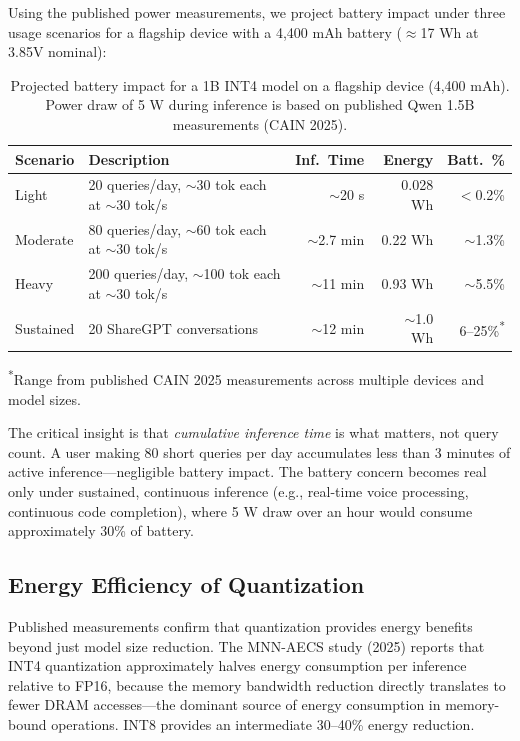 \documentclass[12pt, letterpaper, twoside]{report}
\begin{document}
Using the published power measurements, we project battery impact under three usage scenarios for a flagship device with a 4,400 mAh battery ($\approx$17 Wh at 3.85V nominal):

\begin{table}[H]
\centering
\caption{Projected battery impact for a 1B INT4 model on a flagship device (4,400 mAh). Power draw of 5 W during inference is based on published Qwen 1.5B measurements (CAIN 2025).}
\label{tab:battery_projection}
{\small
\begin{tabular}{@{}lp{4.6cm}rrr@{}}
\toprule
\textbf{Scenario} & \textbf{Description} & \textbf{Inf.\ Time} & \textbf{Energy} & \textbf{Batt.\ \%} \\
\midrule
Light & 20 queries/day, ${\sim}$30 tok each at ${\sim}$30 tok/s & ${\sim}$20 s & 0.028 Wh & ${<}$0.2\% \\[2pt]
Moderate & 80 queries/day, ${\sim}$60 tok each at ${\sim}$30 tok/s & ${\sim}$2.7 min & 0.22 Wh & ${\sim}$1.3\% \\[2pt]
Heavy & 200 queries/day, ${\sim}$100 tok each at ${\sim}$30 tok/s & ${\sim}$11 min & 0.93 Wh & ${\sim}$5.5\% \\[2pt]
Sustained & 20 ShareGPT conversations & ${\sim}$12 min & ${\sim}$1.0 Wh & 6--25\%\textsuperscript{*} \\
\bottomrule
\end{tabular}
}
\vspace{4pt}
{\scriptsize \textsuperscript{*}Range from published CAIN 2025 measurements across multiple devices and model sizes.}
\end{table}

The critical insight is that \textit{cumulative inference time} is what matters, not query count. A user making 80 short queries per day accumulates less than 3 minutes of active inference---negligible battery impact. The battery concern becomes real only under sustained, continuous inference (e.g., real-time voice processing, continuous code completion), where 5 W draw over an hour would consume approximately 30\% of battery.

\subsection{Energy Efficiency of Quantization}
\label{subsec:quant_energy}

Published measurements confirm that quantization provides energy benefits beyond just model size reduction. The MNN-AECS study (2025) reports that INT4 quantization approximately halves energy consumption per inference relative to FP16, because the memory bandwidth reduction directly translates to fewer DRAM accesses---the dominant source of energy consumption in memory-bound operations. INT8 provides an intermediate 30--40\% energy reduction.
\end{document}
